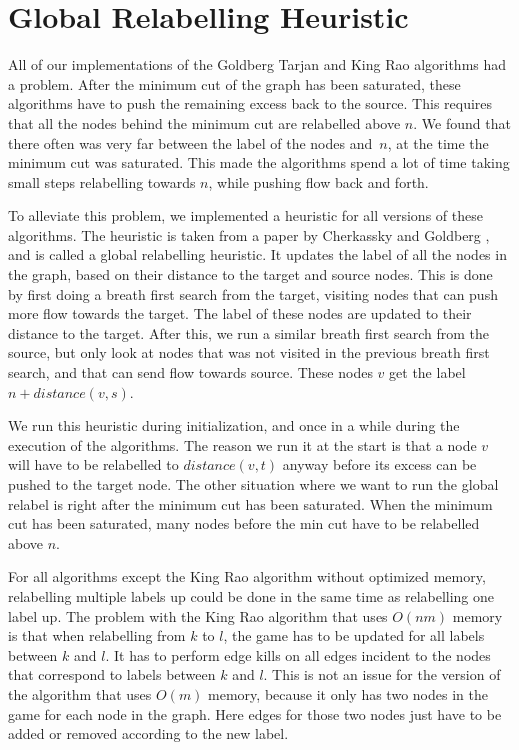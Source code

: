 
\clearpage

\section{Global Relabelling Heuristic}
\label{HeuristicsSection}

All of our implementations of the Goldberg Tarjan and King Rao algorithms had a problem.
After the minimum cut of the graph has been saturated, these algorithms have to push the remaining excess back to the source.
This requires that all the nodes behind the minimum cut are relabelled above $n$.
We found that there often was very far between the label of the nodes and~$n$, at the time the minimum cut was saturated. 
This made the algorithms spend a lot of time taking small steps relabelling towards $n$, while pushing flow back and forth.

To alleviate this problem, we implemented a heuristic for all versions of these algorithms.
The heuristic is taken from a paper by Cherkassky and Goldberg \cite{CherkasskyGoldberg97}, and is called a global relabelling heuristic.
It updates the label of all the nodes in the graph, based on their distance to the target and source nodes.
This is done by first doing a breath first search from the target, visiting nodes that can push more flow towards the target.
The label of these nodes are updated to their distance to the target. 
After this, we run a similar breath first search from the source, but only look at nodes that was not visited in the previous breath first search, and that can send flow towards source.
These nodes $v$ get the label $n + distance(v, s)$.

We run this heuristic during initialization, and once in a while during the execution of the algorithms.
The reason we run it at the start is that a node $v$ will have to be relabelled to $distance(v, t)$ anyway before its excess can be pushed to the target node.
The other situation where we want to run the global relabel is right after the minimum cut has been saturated.
When the minimum cut has been saturated, many nodes before the min cut have to be relabelled above $n$.

For all algorithms except the King Rao algorithm without optimized memory, relabelling multiple labels up could be done in the same time as relabelling one label up.
The problem with the King Rao algorithm that uses $O(nm)$ memory is that when relabelling from $k$ to $l$, the game has to be updated for all labels between $k$ and $l$.
It has to perform edge kills on all edges incident to the nodes that correspond to labels between $k$ and $l$. 
This is not an issue for the version of the algorithm that uses $O(m)$ memory, because it only has two nodes in the game for each node in the graph.
Here edges for those two nodes just have to be added or removed according to the new label.

